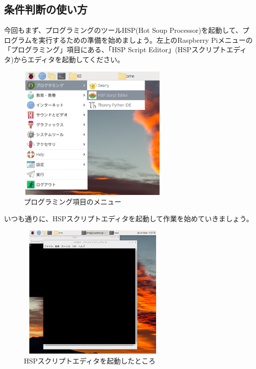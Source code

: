 \newpage
\subsection{条件判断の使い方}

今回もまず、プログラミングのツールHSP(Hot Soup Processor)を起動して、プログラムを実行するための準備を始めましょう。左上のRaspberry Piメニューの「プログラミング」項目にある、「HSP Script Editor」(HSPスクリプトエディタ)からエディタを起動してください。


\begin{figure}[H]
    \begin{center}
      \includegraphics[keepaspectratio,width=7.31cm,height=6.562cm]{text04-img/s_hspmenu.png}
      \caption{プログラミング項目のメニュー}
    \end{center}
    \label{fig:prog_menu}
\end{figure}


いつも通りに、HSPスクリプトエディタを起動して作業を始めていきましょう。

\begin{figure}[H]
    \begin{center}
      \includegraphics[keepaspectratio,width=7.31cm,height=6.562cm]{text04-img/s_hsed.png}
      \caption{HSPスクリプトエディタを起動したところ}
    \end{center}
    \label{fig:prog_menu}
\end{figure}



